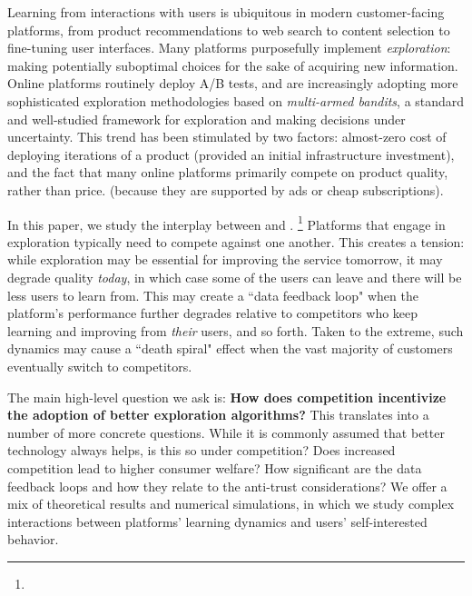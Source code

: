 
Learning from interactions with users is ubiquitous in modern customer-facing platforms, from product recommendations to web search to content selection to fine-tuning user interfaces. Many platforms purposefully implement \emph{exploration}: making potentially suboptimal choices for the sake of acquiring new information. Online platforms routinely deploy A/B tests, and are increasingly adopting  more sophisticated exploration methodologies based on \emph{multi-armed bandits}, a standard and well-studied framework for exploration and making decisions under uncertainty. This trend has been stimulated by two factors: almost-zero cost of deploying iterations of a product (provided an initial infrastructure investment), and the fact that many online platforms primarily compete on product quality, rather than price.
(\eg because they are supported by ads or cheap subscriptions).


In this paper, we study the interplay between \exploration and \competition.%
\footnote{}
Platforms that engage in exploration typically need to compete against one another.  This creates a tension:
while exploration may be essential for improving the service tomorrow, it may degrade quality \emph{today}, in which case some of the users can leave and there will be less users to learn from. This may create a ``data feedback loop" when the platform's performance further degrades relative to competitors who keep learning and improving from \emph{their} users, and so forth. Taken to the extreme, such dynamics may cause a ``death spiral" effect when the vast majority of customers eventually switch to competitors.

The main high-level question we ask is:
\textbf{How does competition incentivize the adoption of better exploration algorithms?}
This translates into a number of more concrete questions. While it is commonly assumed that better technology always helps, is this so under competition? Does increased competition lead to higher consumer welfare? How significant are the data feedback loops
and how they relate to the anti-trust considerations?
We offer a mix of theoretical results and numerical simulations, in which we study complex interactions between platforms' learning dynamics and users' self-interested behavior.

